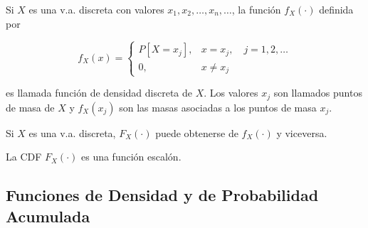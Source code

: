 \begin{Def} Si $X$ es una v.a. discreta con valores $x_1,x_2,\ldots,x_n,\ldots$, la funci\'on $f_X(\cdot)$ definida por

\begin{equation}
f_X(x)=
\begin{cases}
P[X=x_j], & x=x_j,\quad j=1,2,\ldots \\
0, & x\neq x_j
\end{cases}
\end{equation}

es llamada funci\'on de densidad discreta de $X$. Los valores $x_j$ son llamados puntos de masa de $X$ y $f_X(x_j)$ son las masas asociadas a los puntos de masa $x_j$.
\end{Def}

\begin{Teo} Si $X$ es una v.a. discreta, $F_X(\cdot)$ puede obtenerse de $f_X(\cdot)$ y viceversa.
\end{Teo}

\begin{Note}
La CDF $F_X(\cdot)$ es una funci\'on escal\'on.
\end{Note}

\newpage
\subsection{Funciones de Densidad y de Probabilidad Acumulada}

